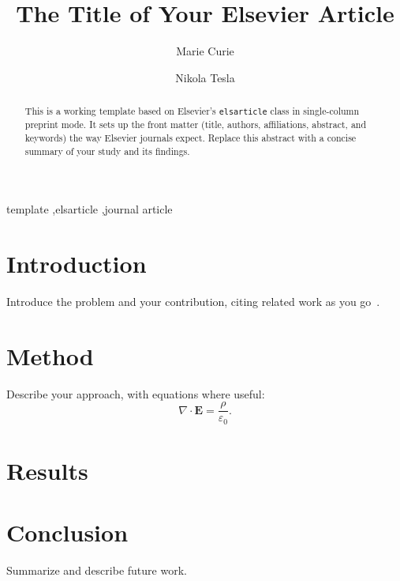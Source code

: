 \documentclass[preprint,12pt]{elsarticle}
\begin{document}
\begin{frontmatter}

\title{The Title of Your Elsevier Article}

\author[a]{Marie Curie}
\author[b]{Nikola Tesla}


\begin{abstract}
This is a working template based on Elsevier's \texttt{elsarticle} class in
single-column preprint mode. It sets up the front matter (title, authors,
affiliations, abstract, and keywords) the way Elsevier journals expect. Replace
this abstract with a concise summary of your study and its findings.
\end{abstract}

\begin{keyword}
template \sep elsarticle \sep journal article
\end{keyword}

\end{frontmatter}

\section{Introduction}
\label{sec:intro}
Introduce the problem and your contribution, citing related work as you
go~\cite{ref1}. \lipsum[1]

\section{Method}
\label{sec:method}
Describe your approach, with equations where useful:
\begin{equation}
  \nabla \cdot \mathbf{E} = \frac{\rho}{\varepsilon_0}.
\end{equation}

\section{Results}
\label{sec:results}
\lipsum[2]

\section{Conclusion}
\label{sec:conclusion}
Summarize and describe future work.



\end{document}
